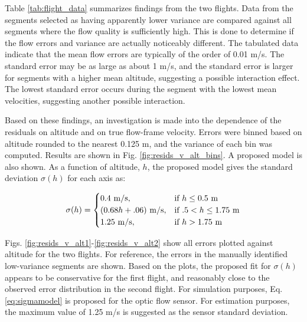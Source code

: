 \documentclass{article}
\begin{document}
Table \ref{tab:flight_data} summarizes findings from the two flights. Data from the segments selected as having apparently lower variance are compared against all segments where the flow quality is sufficiently high. This is done to determine if the flow errors and variance are actually noticeably different. The tabulated data indicate that the mean flow errors are typically of the order of 0.01 m/s. The standard error may be as large as about 1 m/s, and the standard error is larger for segments with a higher mean altitude, suggesting a possible interaction effect. The lowest standard error occurs during the segment with the lowest mean velocities, suggesting another possible interaction.

Based on these findings, an investigation is made into the dependence of the residuals on altitude and on true flow-frame velocity. Errors were binned based on altitude rounded to the nearest 0.125 m, and the variance of each bin was computed. Results are shown in Fig. \ref{fig:resids_v_alt_bins}. A proposed model is also shown. As a function of altitude, $h$, the proposed model gives the standard deviation $\sigma(h)$ for each axis as:

\begin{equation}
\sigma(h) = \begin{cases}
0.4 \ \mathrm{m/s}, & \text{if $h \leq 0.5 $ m} \\
(0.68h + .06) \ \mathrm{m/s}, & \text{if $ .5 < h \leq 1.75 $ m} \\
1.25 \ \mathrm{m/s}, & \text{if $h > 1.75 $ m}
\end{cases}
\label{eq:sigmamodel}
\end{equation}

Figs. \ref{fig:resids_v_alt1}-\ref{fig:resids_v_alt2} show all errors plotted against altitude for the two flights. For reference, the errors in the manually identified low-variance segments are shown. Based on the plots, the proposed fit for $\sigma(h)$ appears to be conservative for the first flight, and reasonably close to the observed error distribution in the second flight. For simulation purposes, Eq. \ref{eq:sigmamodel} is proposed for the optic flow sensor. For estimation purposes, the maximum value of 1.25 m/s is suggested as the sensor standard deviation.
\end{document}
